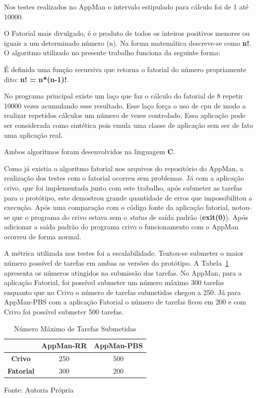Nos testes realizados no AppMan o intervalo estipulado para cálculo foi de 1 até 10000.

O Fatorial mais divulgado, é o produto de todos os inteiros positivos menores ou iguais a um determinado número (n). Na forma matemática descreve-se como \textbf{n!}. O algoritmo utilizado no presente trabalho funciona da seguinte forma:

É definida uma função recursiva que retorna o fatorial do número propriamente dito: {\bf n! = n*(n-1)!}.

No programa principal existe um laço que faz o cálculo do fatorial de 8 repetir 10000 vezes acumulando esse resultado. Esse laço força o uso de cpu de modo a realizar repetidos cálculos um número de vezes controlado. Essa aplicação pode ser considerada como sintética pois emula uma classe de aplicação sem ser de fato uma aplicação real.

Ambos algoritmos foram desenvolvidos na linguagem \textbf{C}.

Como já existia o algoritmo fatorial nos arquivos do repositório do AppMan, a realização dos testes com o fatorial ocorreu sem problemas. Já com a aplicação crivo, que foi implementada junto com este trabalho, após submeter as tarefas para o protótipo, este demostrou grande quantidade de erros que impossibilitou a execução. Após uma comparação com o código fonte da aplicação fatorial, notou-se que o programa do crivo estava sem o \emph{status} de saída padrão (\textbf{exit(0)}). Após adicionar a saída padrão do programa crivo o funcionamento com o AppMan ocorreu de forma normal.

A métrica utilizada nos testes foi a escalabilidade. Tentou-se submeter o maior número possível de tarefas em ambas as versões do protótipo. A Tabela~\ref{tab:num_max_tarefas} apresenta os números atingidos na submissão das tarefas. No AppMan, para a aplicação Fatorial, foi possível submeter um número máximo 300 tarefas enquanto que no Crivo o número de tarefas submetidas chegou a 250. Já para AppMan-PBS com a aplicação Fatorial o número de tarefas ficou em 200 e com Crivo foi possível submeter 500 tarefas.

\begin{table}[hbtp]
\begin{center}
\caption{Número Máximo de Tarefas Submetidas}
\label{tab:num_max_tarefas}
\begin{tabular}{c|c|c}
	\hline
		& {\bf AppMan-RR} & {\bf AppMan-PBS}\\
	\hline
	{\bf Crivo} & 250 & 500\\ \hline
	\textbf{Fatorial} & 300 & 200\\ \hline
\end{tabular}
\end{center}
\begin{center}
Fonte: Autoria Própria
\end{center}
\end{table}

